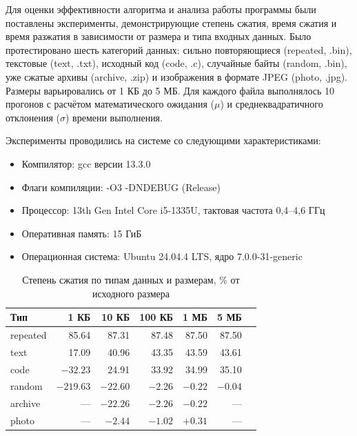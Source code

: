 \documentclass[a4paper]{article}
\begin{document}
Для оценки эффективности алгоритма и анализа работы программы были
поставлены эксперименты, демонстрирующие степень сжатия, время сжатия
и время разжатия в зависимости от размера и типа входных данных.
Было протестировано шесть категорий данных: сильно повторяющиеся
(repeated, .bin), текстовые (text, .txt), исходный код (code, .c),
случайные байты (random, .bin), уже сжатые архивы (archive, .zip)
и изображения в формате JPEG (photo, .jpg). Размеры варьировались
от 1 КБ до 5 МБ. Для каждого файла выполнялось 10 прогонов
с расчётом математического ожидания ($\mu$) и среднеквадратичного
отклонения ($\sigma$) времени выполнения.

Эксперименты проводились на системе со следующими характеристиками:

\begin{itemize}
    \item Компилятор: gcc версии 13.3.0
    \item Флаги компиляции: -O3 -DNDEBUG (Release)
    \item Процессор: 13th Gen Intel Core i5-1335U, тактовая частота 0,4--4,6 ГГц
    \item Оперативная память: 15 ГиБ
    \item Операционная система: Ubuntu 24.04.4 LTS, ядро 7.0.0-31-generic
\end{itemize}

\begin{table}[h]
\centering
\small
\caption{Степень сжатия по типам данных и размерам, \% от исходного размера}
\label{tab:ratio}
\begin{tabular}{lrrrrrr}
\toprule
Тип & 1 КБ & 10 КБ & 100 КБ & 1 МБ & 5 МБ \\
\midrule
repeated & 85.64 & 87.31 & 87.48 & 87.50 & 87.50 \\
text     & 17.09 & 40.96 & 43.35 & 43.59 & 43.61 \\
code     & $-32.23$ & 24.91 & 33.92 & 34.99 & 35.10 \\
random   & $-219.63$ & $-22.60$ & $-2.26$ & $-0.22$ & $-0.04$ \\
archive  & ---   & $-22.26$ & $-2.26$ & $-0.22$ & ---   \\
photo    & ---   & $-2.44$  & $-1.02$ & $+0.31$ & ---   \\
\bottomrule
\end{tabular}
\end{table}
\end{document}
